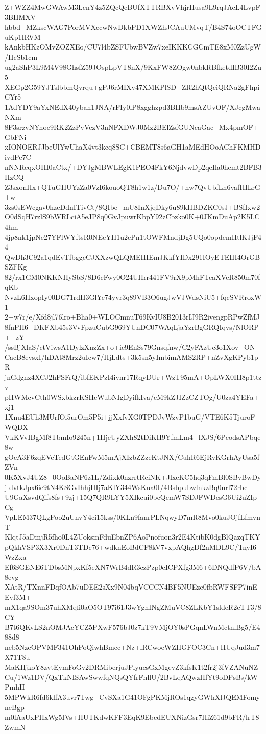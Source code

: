 Z+WZZ4MwGWAwM3LcnY4z5ZQcQcBUfXTTRBXvVhjrHusa9L9rqJAcL4LvpF3BHMXV
hbbd+MZkscWAG7PorMVXccwNwDkbPD1XWZhJCAuUMvqT/B4S74oOCTFGuKp1IRVM
kAnkbHKzOMvZOZXEo/CU7l4bZSFUbwBVZw7xeIKKKCGCmTE8xM0ZzUgW/HcSb1cm
ug2aShP3L9M4V98GhsfZ59JOspLpVT8nX/9KxFW8ZOgw0nbkRBfketdIB30I2Zu5
XEGp2G59YJTslbbmQvrqu+gPJ6rMIXv47XMKPlSD+ZR2hQtQciQRNa2gFhpiCYr5
1AdYDY9aYxNEdX40yban1JNA/rFIy0lP8xgghzpd3BHb9msAZUvOF/XJcgMwaNXm
8F3srzvNYnoe9RK2ZzPvVezV3nNFXDWJ0Mz2BElZsfGUNcaGac+Mx4pmOF+GbFNi
xIONOERJJbeUlYwUhaX4vt3kcq8SC+CBEMT8s6aGH1aMEdHOoAChFKMHDivdPe7C
nNNReqxOHI0aCtx/+DYJgMBWLEgK1PEO4FkY6NjdvwDp2qeIla0hemt2BFB3HzCQ
Z3sxonHx+QTuGHUYzZa0VzI6kouoQT8h1w1z/Du7O/+hw7QvUbfLh6vafHILrG+w
3zs0sEWcgav0hzeDdnITivCt/8QIbe+mU8InXjqDky6u89kHBDZKC0sJ+BSfIxw2
O0dSqH7rzlS9bWRLciA5eJP8q0GvJpuwrKbpY92zCbzko0K+0JKmDuAp2K5LC4hm
4jp8nk1jpNe27YFlWYftsR0NEcYH1u2cPn1tOWFMndjDg5UQo0opdemHtlKJjF44
QwDh3C92a1qdEvTfbggcCJXXzwQLQMEIHEmJKkfYIDx291IOyETEIH4OrGBSZFKg
82/rx1GM0NKKNHySbS/8D6cFwy0O24UHrr441FV9rX9pMhFTcaXVeR850m70fqKb
NvzL6HxopIy00DG71rdH3GlYe74yvr3q89VB3O6ugJwVJWdsNiU5+fqcSVRroxW1
2+w7r/e/Xfd8jl76lro+Bha0+WLOCmnuT69KvIU8B2013rIJ9R2ivengpRPwZfMJ
8fnPH6+DKFXb45s3VvFpzuCubG969YUnDC07WAqLjaYzrBgGRQIqvs/NlORP++zY
/ssBjXlaS/ctViwsA1DylzXnzZx+o+ie9EnSs79Gnsqfnw/C2yFAzUc3o1Xov+ON
CacB8evsxI/hDAt8Mrz2uIcw7/HjLdts+3k5sn5yImbimAMS2RP+nZvXgKPyb1pR
jnGdgnz4XCJ2hFSFrQ/ibfEKPzI4ivnr17RqyDUr+WzT95mA+OpLWX0IH8p1ttzv
pHWMcvCth0WSxbkzrKSHcWubNIgDyifkIva/eM9kZJIZzCZTOg/U0za4YEFa+xj1
1Xnu4EUh3MUrfOi5urOm5P5i+jjXxfvXG0TPDJvWzvP1buG/VTE6K5TjuroFWQDX
VkKVvIBgMf8TbmIo9245n+1HjeUyZXh82tDiKH9YfmLm4+lXJS/6PcodsAPbqe8w
gOeA3F6zqEVcTedGtGEnFwM5mAjXIzbZZzeKtJNX/CuhR6EjRvKGrhAyUsa5fZVn
0K5XvJ4UZ8+0OoBaNP6z1L/Zdixk0nzrrtReiNK+JlxeKC5hq3qFmBl0SBvBwDyj
dvtkJpx6ie9tN4KSGvIhhjHIj7aKlY344WsKua0I/4BsbpubwlnkzBq0url72rbc
U9GaXsvdQifs8fs+9zj+15Q7QR9LYY5XIkcui0bcQemW7SDJFWDesG6Ui2uZIpCg
VpLEM37QLgPoo2uUnvY4ci15kss/0KLn9fanrPLNqwyD7mR8Mvo0kuJOjfLfmvnT
KlqtJ5aDmjR5fho0L4ZUoksmFduEbnZP6AoPnofuon3r2E4KtibK0dgBlQazqTKY
pQkhVSP3X3Xr0DnT3TDc76+wdknEoBdCF8kV7vxpAQhgDf2nMDL9C/TnyI6WzZxa
Ef6SGENE6TDbsMNpxKf5eXN7WrB4dR3czPzp0eICPXfg3M6+6DNQdfP6V/bA8evg
XAtR/TXnnFDqfOAb7uDEE2sXx9N04bqVCCCN4BF5NUEze0fbRWFSFP7inEEvf3M+
mX1qa9SOm37uhXMqfi0aO5OT97i61J3wYgnINgZMuVC8ZLKbY1sldeR2cTT3/8CY
B7t6QKvLS2nOMJAcYCZ5PXwF576bJ0z7kT9VMjOY0sPGqnLWnMctnlBg5/E488d8
neb5NzeOPVMF341OhPoQiwhBmcc+Nz+lRCwoeWZHGFOC3Cn+IIUqJud3m7X71T8u
MaKHjkoY8zvtEymFoGv2DRMiberjuJPlyucsGxMgevZ3kfsK1t2fr2j3fVZANuNZ
Cu/1Wz1DV/QxTkNISAwSwwfqNQsQYfrFhllU/2BvLqAQwzHfYt9oDPsBs/kWPmhH
5MPWkR6fd6klfA3uvr7Twg+CvSXa1G41OFgPKMjROs1qgyGWhXlJQEMFomyneBgp
m0lAaUxPHxWg5IVs+HUTKdwKFF3EqK9EbcdEUXNizGsr7HiZ61d9bFR/lrT8ZwmN
